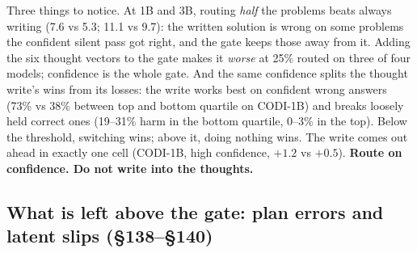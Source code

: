 \documentclass{article}
\begin{document}
\begin{table}[h]
\caption{Confidence-gated routing: accuracy change (points) on the 838 long-chain GSM8K test problems when the least-confident fraction of problems is sent to the model's own written solution. 95\% intervals at 25\% and 50\%.}
\label{tab:cascade}
\centering\scriptsize
\setlength{\tabcolsep}{3pt}
\end{table}

Three things to notice. At 1B and 3B, routing \emph{half} the problems beats always writing (7.6 vs 5.3; 11.1 vs 9.7): the written solution is wrong on some problems the confident silent pass got right, and the gate keeps those away from it. Adding the six thought vectors to the gate makes it \emph{worse} at 25\% routed on three of four models; confidence is the whole gate. And the same confidence splits the thought write's wins from its losses: the write works best on confident wrong answers (73\% vs 38\% between top and bottom quartile on CODI-1B) and breaks loosely held correct ones (19--31\% harm in the bottom quartile, 0--3\% in the top). Below the threshold, switching wins; above it, doing nothing wins. The write comes out ahead in exactly one cell (CODI-1B, high confidence, $+1.2$ vs $+0.5$). \textbf{Route on confidence. Do not write into the thoughts.}

\subsection{What is left above the gate: plan errors and latent slips (\S138--\S140)}
\end{document}
